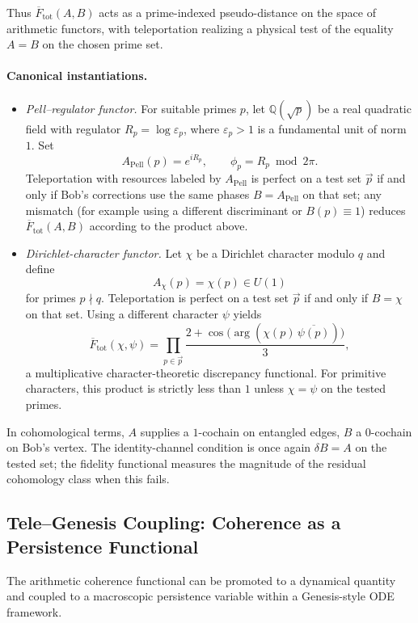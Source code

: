 \documentclass[11pt]{article}
\begin{document}
Thus $\overline{F}_{\mathrm{tot}}(A,B)$ acts as a prime-indexed pseudo-distance on the space of arithmetic functors, with teleportation realizing a physical test of the equality $A=B$ on the chosen prime set.

\paragraph{Canonical instantiations.}

\begin{itemize}
\item \emph{Pell–regulator functor.} For suitable primes $p$, let $\mathbb{Q}(\sqrt{p})$ be a real quadratic field with regulator $R_p = \log\varepsilon_p$, where $\varepsilon_p>1$ is a fundamental unit of norm $1$. Set
\[
A_{\mathrm{Pell}}(p) = e^{iR_p}, \qquad \phi_p = R_p \bmod 2\pi.
\]
Teleportation with resources labeled by $A_{\mathrm{Pell}}$ is perfect on a test set $\vec p$ if and only if Bob's corrections use the same phases $B=A_{\mathrm{Pell}}$ on that set; any mismatch (for example using a different discriminant or $B(p)\equiv 1$) reduces $\overline{F}_{\mathrm{tot}}(A,B)$ according to the product above.

\item \emph{Dirichlet-character functor.} Let $\chi$ be a Dirichlet character modulo $q$ and define
\[
A_\chi(p) = \chi(p) \in U(1)
\]
for primes $p\nmid q$. Teleportation is perfect on a test set $\vec p$ if and only if $B=\chi$ on that set. Using a different character $\psi$ yields
\[
\overline{F}_{\mathrm{tot}}(\chi,\psi)
= \prod_{p\in\vec p} \frac{2+\cos\bigl(\arg(\chi(p)\,\overline{\psi(p)})\bigr)}{3},
\]
a multiplicative character-theoretic discrepancy functional. For primitive characters, this product is strictly less than $1$ unless $\chi=\psi$ on the tested primes.
\end{itemize}

In cohomological terms, $A$ supplies a $1$-cochain on entangled edges, $B$ a $0$-cochain on Bob's vertex. The identity-channel condition is once again $\delta B = A$ on the tested set; the fidelity functional measures the magnitude of the residual cohomology class when this fails.

\subsection{Tele--Genesis Coupling: Coherence as a Persistence Functional}

The arithmetic coherence functional can be promoted to a dynamical quantity and coupled to a macroscopic persistence variable within a Genesis-style ODE framework.
\end{document}
